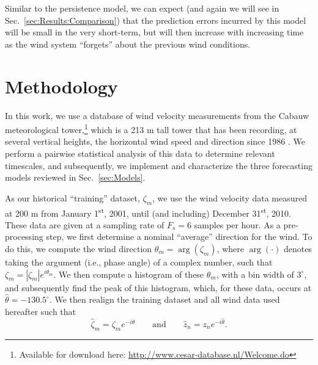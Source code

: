 \documentclass[11pt, oneside]{article}
\newcommand{\secref}[1]{Sec.~\ref{#1}}
\begin{document}
Similar to the persistence model, we can expect (and again we will see in \secref{sec:Results:Comparison}) that the prediction errors incurred by this model will be small in the very short-term, but will then increase with increasing time as the wind system ``forgets'' about the previous wind conditions.

\section{Methodology}\label{sec:Methodology}
In this work, we use a database of wind velocity measurements from the Cabauw meteorological tower,\footnote{Available for download here: \url{http://www.cesar-database.nl/Welcome.do}} which is a 213 m tall tower that has been recording, at several vertical heights, the horizontal wind speed and direction since 1986 \citep[Table I]{VanUldenWieringa1996}. %
We perform a pairwise statistical analysis of this data to determine relevant timescales, and
subsequently, we implement and characterize the three forecasting models reviewed in \secref{sec:Models}.

As our historical ``training'' dataset, $\zeta_m$, we use the wind velocity data measured at 200 m from January 1\textsuperscript{st}, 2001, until (and including) December 31\textsuperscript{st}, 2010.
These data are given at a sampling rate of $F_s = 6$ samples per hour.
As a pre-processing step, we first determine a nominal ``average'' direction for the wind.
To do this, we compute the wind direction $\theta_m = \arg (\zeta_m)$, where $\arg ( \cdot )$ denotes taking the argument (i.e., phase angle) of a complex number, such that $\zeta_m = |\zeta_m| e^{i \theta_m}$.
We then compute a histogram of these $\theta_m$, with a bin width of $3^\circ$, and subsequently find the peak of this histogram, which, for these data, occurs at $\hat{\theta} = -130.5^\circ$.
We then realign the training dataset and all wind data used hereafter such that
\begin{equation}
\hat{\zeta}_m = \zeta_m e^{-i\hat{\theta}}
\quad\quad \text{and} \quad\quad
\hat{z}_n = z_n e^{-i\hat{\theta}}.
\end{equation}
\end{document}
